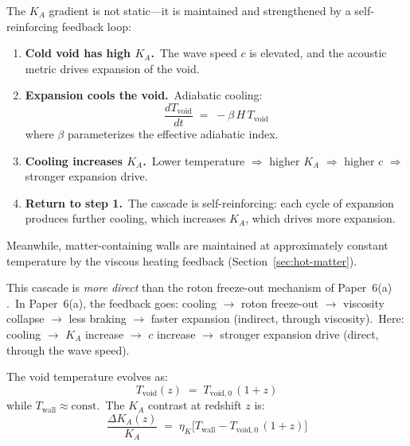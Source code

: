 \documentclass[12pt,letterpaper]{article}
\newcommand{\Ka}{K_{\!A}}
\newcommand{\etaK}{\eta_{\!K}}
\begin{document}
The $\Ka$ gradient is not static---it is maintained and strengthened by
a self-reinforcing feedback loop:

\begin{enumerate}[leftmargin=2em]
  \item \textbf{Cold void has high $\Ka$.}\ The wave speed $c$ is elevated,
    and the acoustic metric drives expansion of the void.

  \item \textbf{Expansion cools the void.}\ Adiabatic cooling:
    \begin{equation}
      \frac{dT_{\mathrm{void}}}{dt} \;=\; -\beta\,H\,T_{\mathrm{void}}
      \label{eq:Tvoid-evolution}
    \end{equation}
    where $\beta$ parameterizes the effective adiabatic index.

  \item \textbf{Cooling increases $\Ka$.}\ Lower temperature $\Rightarrow$
    higher $\Ka$ $\Rightarrow$ higher $c$ $\Rightarrow$ stronger expansion
    drive.

  \item \textbf{Return to step 1.}\ The cascade is self-reinforcing: each
    cycle of expansion produces further cooling, which increases $\Ka$,
    which drives more expansion.
\end{enumerate}

Meanwhile, matter-containing walls are maintained at approximately constant
temperature by the viscous heating feedback (Section~\ref{sec:hot-matter}).

This cascade is \emph{more direct} than the roton freeze-out mechanism of
Paper~6(a) \cite{otto-cooling}.\ In Paper~6(a), the feedback goes: cooling
$\to$ roton freeze-out $\to$ viscosity collapse $\to$ less braking $\to$
faster expansion (indirect, through viscosity).\ Here: cooling $\to$ $\Ka$
increase $\to$ $c$ increase $\to$ stronger expansion drive (direct, through
the wave speed).

The void temperature evolves as:
%
\begin{equation}
  T_{\mathrm{void}}(z) \;=\; T_{\mathrm{void},0}\,(1 + z)
  \label{eq:Tvoid-z}
\end{equation}
%
while $T_{\mathrm{wall}} \approx \mathrm{const}$.\ The $\Ka$ contrast at
redshift $z$ is:
%
\begin{equation}
  \frac{\Delta\Ka(z)}{\Ka} \;=\; \etaK\bigl[T_{\mathrm{wall}}
    - T_{\mathrm{void},0}\,(1 + z)\bigr]
  \label{eq:DKA-z}
\end{equation}
\end{document}
